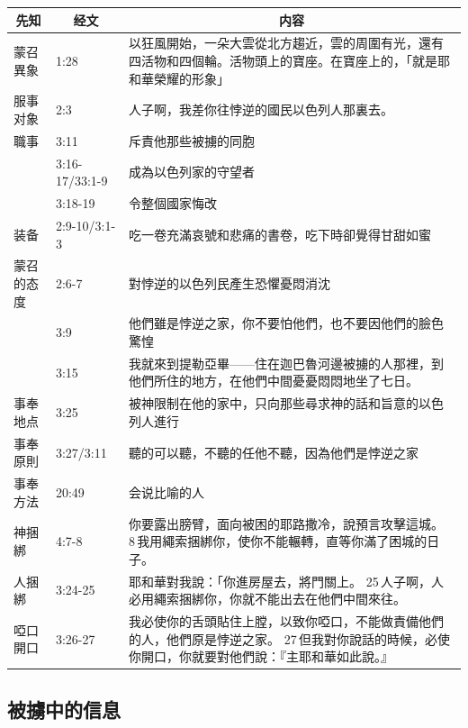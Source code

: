 \begin{table}[H]
\centering
\begin{tabular}{p{}|p{}|p{10.50cm}}\hline\hline
\multicolumn{1}{c|}{先知}&\multicolumn{1}{c|}{经文}&\multicolumn{1}{c}{内容}\\\hline
蒙召異象&1:28&以狂風開始，一朵大雲從北方趨近，雲的周圍有光，還有四活物和四個輪。活物頭上的寶座。在寶座上的，「就是耶和華榮耀的形象」\\\hline
服事对象&2:3&人子啊，我差你往悖逆的國民以色列人那裏去。\\\hline 
職事&3:11&斥責他那些被擄的同胞\\\hline
&3:16-17/33:1-9&成為以色列家的守望者\\\hline
&3:18-19&令整個國家悔改\\\hline
装备&2:9-10/3:1-3&吃一卷充滿哀號和悲痛的書卷，吃下時卻覺得甘甜如蜜\\\hline
蒙召的态度&2:6-7&對悖逆的以色列民產生恐懼憂悶消沈\\\hline
&3:9&他們雖是悖逆之家，你不要怕他們，也不要因他們的臉色驚惶\\\hline
&3:15&我就來到提勒亞畢——住在迦巴魯河邊被擄的人那裡，到他們所住的地方，在他們中間憂憂悶悶地坐了七日。\\\hline
事奉地点&3:25&被神限制在他的家中，只向那些尋求神的話和旨意的以色列人進行\\\hline
事奉原則&3:27/3:11&聽的可以聽，不聽的任他不聽，因為他們是悖逆之家\\\hline
事奉方法&20:49&会说比喻的人\\\hline
神捆綁&4:7-8&你要露出膀臂，面向被困的耶路撒冷，說預言攻擊這城。 8 我用繩索捆綁你，使你不能輾轉，直等你滿了困城的日子。\\\hline
人捆綁&3:24-25&耶和華對我說：「你進房屋去，將門關上。 25 人子啊，人必用繩索捆綁你，你就不能出去在他們中間來往。 \\\hline

啞口開口&3:26-27&我必使你的舌頭貼住上膛，以致你啞口，不能做責備他們的人，他們原是悖逆之家。 27 但我對你說話的時候，必使你開口，你就要對他們說：『主耶和華如此說。』\\\hline
\end{tabular}
\end{table}



\subsection{被擄中的信息}
